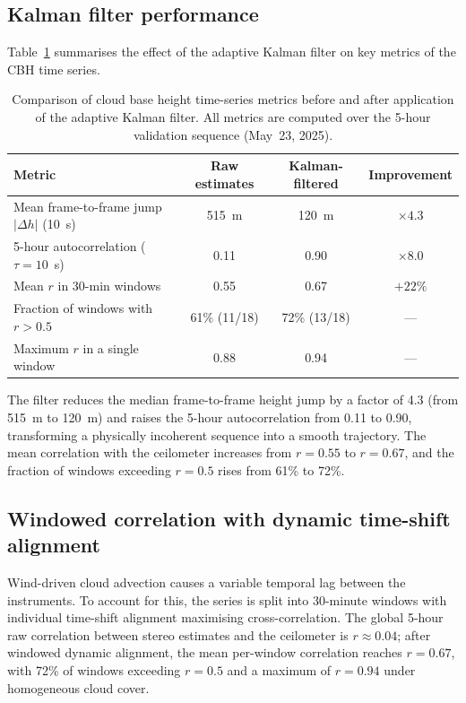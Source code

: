 \documentclass[preprint,
superscriptaddress,
amsmath,amssymb,aps,
twoside,final,secnumarabic,
nofootinbib]{revtex4-2}
\begin{document}
\subsection{Kalman filter performance}

Table~\ref{tab:kalman} summarises the effect of the adaptive Kalman filter on key metrics of the CBH time series.

\begin{table}[t]
\centering
\caption{Comparison of cloud base height time-series metrics before and after application of the adaptive Kalman filter. All metrics are computed over the 5-hour validation sequence (May~23, 2025).}\label{tab:kalman}
\begin{tabular}{lccc}
\hline
Metric & Raw estimates & Kalman-filtered & Improvement \\
\hline
Mean frame-to-frame jump $|\Delta h|$ (10~s) & 515~m & 120~m & $\mathbf{\times 4.3}$ \\
5-hour autocorrelation ($\tau = 10$~s) & 0.11 & 0.90 & $\mathbf{\times 8.0}$ \\
Mean $r$ in 30-min windows & 0.55 & 0.67 & $+22\%$ \\
Fraction of windows with $r > 0.5$ & 61\% (11/18) & 72\% (13/18) & --- \\
Maximum $r$ in a single window & 0.88 & 0.94 & --- \\
\hline
\end{tabular}
\end{table}

The filter reduces the median frame-to-frame height jump by a factor of 4.3 (from 515~m to 120~m) and raises the 5-hour autocorrelation from 0.11 to 0.90, transforming a physically incoherent sequence into a smooth trajectory. The mean correlation with the ceilometer increases from $r = 0.55$ to $r = 0.67$, and the fraction of windows exceeding $r = 0.5$ rises from 61\% to 72\%.

\subsection{Windowed correlation with dynamic time-shift alignment}

Wind-driven cloud advection causes a variable temporal lag between the instruments. To account for this, the series is split into 30-minute windows with individual time-shift alignment maximising cross-correlation. The global 5-hour raw correlation between stereo estimates and the ceilometer is $r \approx 0.04$; after windowed dynamic alignment, the mean per-window correlation reaches $r = 0.67$, with 72\% of windows exceeding $r = 0.5$ and a maximum of $r = 0.94$ under homogeneous cloud cover.
\end{document}
